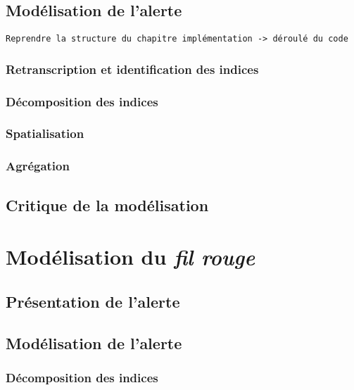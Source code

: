 \subsection{Modélisation de l'alerte}
\label{subsec:10-2-2}

\begin{verbatim}
Reprendre la structure du chapitre implémentation -> déroulé du code
\end{verbatim}

\subsubsection{Retranscription et identification des indices}
\label{subsec:10-2-2-1}

\subsubsection{Décomposition des indices}
\label{subsec:10-2-2-2}

\subsubsection{Spatialisation}
\label{subsec:10-2-2-3}

\subsubsection{Agrégation}
\label{subsec:10-2-2-4}

\subsection{Critique de la modélisation}
\label{subsec:10-2-3}

\section{Modélisation du \emph{fil rouge}}
\label{sec:10-3}

\subsection{Présentation de l'alerte}
\label{subsec:10-3-1}

\subsection{Modélisation de l'alerte}
\label{subsec:10-3-2}

\subsubsection{Décomposition des indices}
\label{subsec:10-3-2-1}

